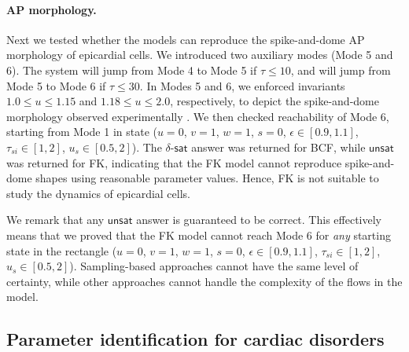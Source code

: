 \paragraph{AP morphology.}
Next we tested whether the models can reproduce the spike-and-dome AP morphology of epicardial cells. We introduced two auxiliary modes (Mode 5 and 6). The system will jump from Mode 4 to Mode 5 if $\tau \le 10$, and will jump from Mode 5 to Mode 6 if $\tau \le 30$. In Modes 5 and 6, we enforced invariants $1.0 \le u \le 1.15$ and $1.18 \le u \le 2.0$, respectively, to depict the spike-and-dome morphology observed experimentally \cite{nabauer96}. We then checked reachability of Mode 6, starting from Mode 1 in state ($u = 0$, $v = 1$, $w = 1$, $s = 0$, $\epsilon \in [0.9,1.1]$, $\tau_{si} \in [1,2]$, $u_s \in [0.5,2]$). The $\delta$-$\mathsf{sat}$ answer
was returned for BCF, while $\mathsf{unsat}$ was returned for FK, indicating that the FK model cannot reproduce spike-and-dome shapes using reasonable parameter values. Hence, FK is not suitable to study the dynamics of epicardial cells.

We remark that any $\mathsf{unsat}$ answer is guaranteed to be correct. This effectively
means that we proved that the FK model cannot reach Mode 6 for {\em any} starting state in the 
rectangle ($u = 0$, $v = 1$, $w = 1$, $s = 0$, $\epsilon \in [0.9,1.1]$, $\tau_{si} \in [1,2]$, 
$u_s \in [0.5,2]$). Sampling-based approaches cannot have the same level of certainty, while other
approaches cannot handle the complexity of the flows in the model.


\subsection{Parameter identification for cardiac disorders}

